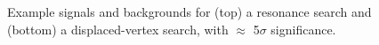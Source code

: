 \documentclass[b1]{sciposter}
\begin{document}
\begin{multicols}{3}
	\begin{figure}
		\begin{center}
		\end{center}
		\caption{Example signals and backgrounds for (top) a resonance search and (bottom) a displaced-vertex search, with $\approx$ 5$\sigma$ significance.}
	\end{figure}


	\begin{figure}
		\begin{center}


\end{center}
\end{figure}
\end{multicols}
\end{document}
